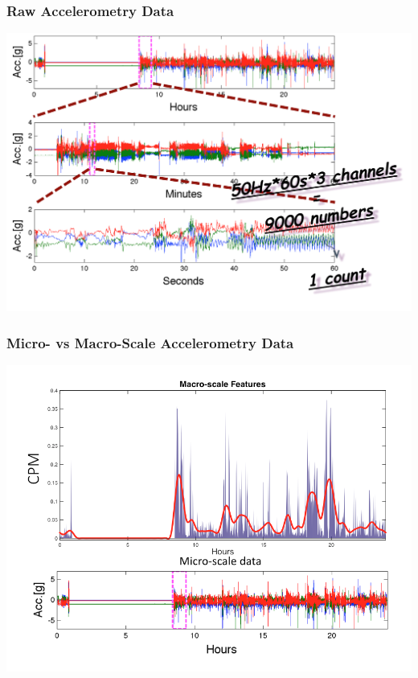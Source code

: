 \documentclass[10pt]{beamer}\usepackage[]{graphicx}\usepackage[]{color}
\begin{document}
\begin{frame}
\frametitle{Raw Accelerometry Data}
\includegraphics[width=\textwidth]{raw_accel_data_pt2}
\end{frame}













\begin{frame}
\frametitle{Micro- vs Macro-Scale Accelerometry Data}
\includegraphics[width=\textwidth]{micro_vs_macro_accel_data}
\end{frame}
\end{document}
